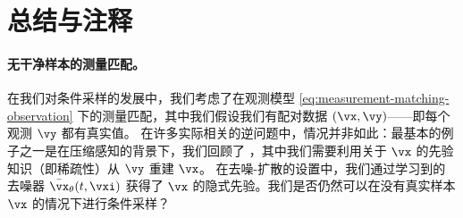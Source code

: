 \documentclass[../../book-main_zh.tex]{subfiles}
\begin{document}




\section{总结与注释}
\paragraph{无干净样本的测量匹配。} 在我们对条件采样的发展中，我们考虑了在观测模型 \eqref{eq:measurement-matching-observation} 下的测量匹配，其中我们假设我们有配对数据 $(\vx, \vy)$——即每个观测 $\vy$ 都有真实值。
在许多实际相关的逆问题中，情况并非如此：最基本的例子之一是在压缩感知的背景下，我们回顾了 ，其中我们需要利用关于 $\vx$ 的先验知识（即稀疏性）从 $\vy$ 重建 $\vx$。
在去噪-扩散的设置中，我们通过学习到的去噪器 $\bar{\vx}_{\theta}(t, \vxi)$ 获得了 $\vx$ 的隐式先验。我们是否仍然可以在没有真实样本 $\vx$ 的情况下进行条件采样？
\end{document}

